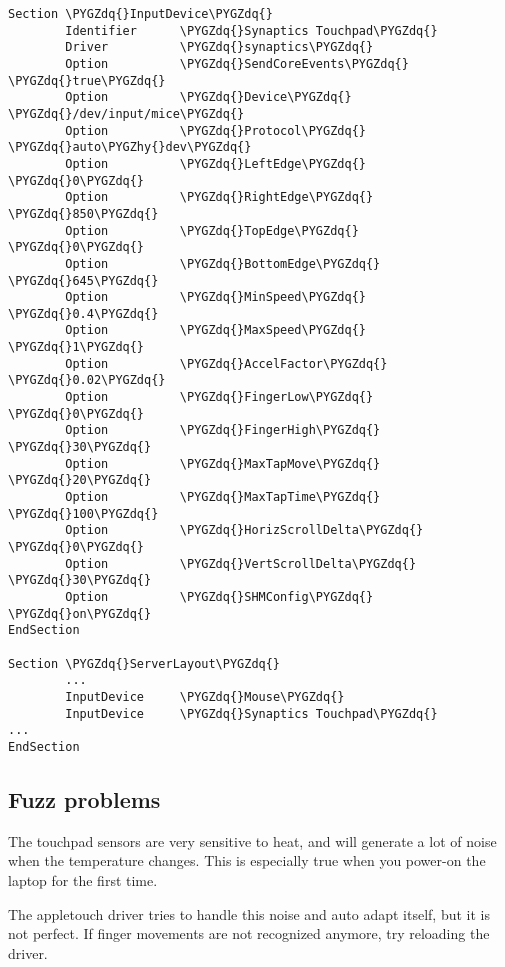 \documentclass[a4paper,8pt,english]{sphinxmanual}
\def\PYGZhy{\char`\-}
\def\PYGZdq{\char`\"}
\begin{document}
\begin{Verbatim}[commandchars=\\\{\}]
Section \PYGZdq{}InputDevice\PYGZdq{}
        Identifier      \PYGZdq{}Synaptics Touchpad\PYGZdq{}
        Driver          \PYGZdq{}synaptics\PYGZdq{}
        Option          \PYGZdq{}SendCoreEvents\PYGZdq{}        \PYGZdq{}true\PYGZdq{}
        Option          \PYGZdq{}Device\PYGZdq{}                \PYGZdq{}/dev/input/mice\PYGZdq{}
        Option          \PYGZdq{}Protocol\PYGZdq{}              \PYGZdq{}auto\PYGZhy{}dev\PYGZdq{}
        Option          \PYGZdq{}LeftEdge\PYGZdq{}              \PYGZdq{}0\PYGZdq{}
        Option          \PYGZdq{}RightEdge\PYGZdq{}             \PYGZdq{}850\PYGZdq{}
        Option          \PYGZdq{}TopEdge\PYGZdq{}               \PYGZdq{}0\PYGZdq{}
        Option          \PYGZdq{}BottomEdge\PYGZdq{}            \PYGZdq{}645\PYGZdq{}
        Option          \PYGZdq{}MinSpeed\PYGZdq{}              \PYGZdq{}0.4\PYGZdq{}
        Option          \PYGZdq{}MaxSpeed\PYGZdq{}              \PYGZdq{}1\PYGZdq{}
        Option          \PYGZdq{}AccelFactor\PYGZdq{}           \PYGZdq{}0.02\PYGZdq{}
        Option          \PYGZdq{}FingerLow\PYGZdq{}             \PYGZdq{}0\PYGZdq{}
        Option          \PYGZdq{}FingerHigh\PYGZdq{}            \PYGZdq{}30\PYGZdq{}
        Option          \PYGZdq{}MaxTapMove\PYGZdq{}            \PYGZdq{}20\PYGZdq{}
        Option          \PYGZdq{}MaxTapTime\PYGZdq{}            \PYGZdq{}100\PYGZdq{}
        Option          \PYGZdq{}HorizScrollDelta\PYGZdq{}      \PYGZdq{}0\PYGZdq{}
        Option          \PYGZdq{}VertScrollDelta\PYGZdq{}       \PYGZdq{}30\PYGZdq{}
        Option          \PYGZdq{}SHMConfig\PYGZdq{}             \PYGZdq{}on\PYGZdq{}
EndSection

Section \PYGZdq{}ServerLayout\PYGZdq{}
        ...
        InputDevice     \PYGZdq{}Mouse\PYGZdq{}
        InputDevice     \PYGZdq{}Synaptics Touchpad\PYGZdq{}
...
EndSection
\end{Verbatim}


\subsection{Fuzz problems}
\label{input/devices/appletouch:fuzz-problems}
The touchpad sensors are very sensitive to heat, and will generate a lot of
noise when the temperature changes. This is especially true when you power-on
the laptop for the first time.

The appletouch driver tries to handle this noise and auto adapt itself, but it
is not perfect. If finger movements are not recognized anymore, try reloading
the driver.
\end{document}
